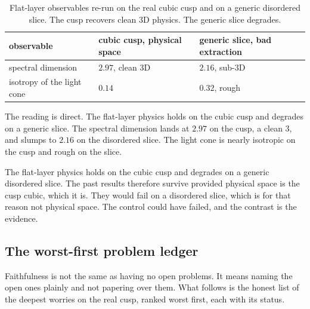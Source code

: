 \begin{table}[ht]
\centering
\begin{tabular}{@{}lll@{}}
\toprule
observable & cubic cusp, physical space & generic slice, bad extraction \\
\midrule
spectral dimension & $2.97$, clean $3$D & $2.16$, sub-$3$D \\
isotropy of the light cone & $0.14$ & $0.32$, rough \\
\bottomrule
\end{tabular}
\caption{Flat-layer observables re-run on the real cubic cusp and on a generic disordered slice. The cusp recovers clean $3$D physics. The generic slice degrades.}
\label{tab:cusp-retest}
\end{table}

The reading is direct. The flat-layer physics holds on the cubic cusp and degrades on a generic slice. The spectral dimension lands at $2.97$ on the cusp, a clean $3$, and slumps to $2.16$ on the disordered slice. The light cone is nearly isotropic on the cusp and rough on the slice.

\begin{result}
The flat-layer physics holds on the cubic cusp and degrades on a generic disordered slice. The past results therefore survive provided physical space is the cusp cubic, which it is. They would fail on a disordered slice, which is for that reason not physical space. The control could have failed, and the contrast is the evidence.
\end{result}

\subsection{The worst-first problem ledger}

Faithfulness is not the same as having no open problems. It means naming the open ones plainly and not papering over them. What follows is the honest list of the deepest worries on the real cusp, ranked worst first, each with its status.

